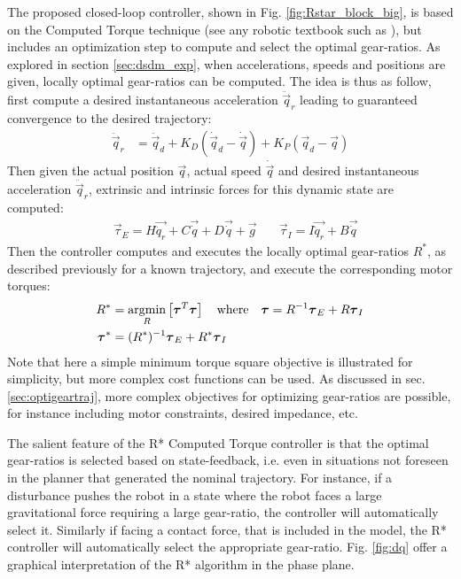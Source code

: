 The proposed closed-loop controller, shown in Fig. \ref{fig:Rstar_block_big}, is based on the Computed Torque technique (see any robotic textbook such as \cite{asada_robot_1986}), but includes an optimization step to compute and select the optimal gear-ratios. As explored in section \ref{sec:dsdm_exp}, when accelerations, speeds and positions are given, locally optimal gear-ratios can be computed. The idea is thus as follow, first compute a desired instantaneous acceleration $\ddot{\vec{q}}_r$ leading to guaranteed convergence to the desired trajectory:
%
\begin{align}
\ddot{\vec{q}}_r &= \ddot{\vec{q}}_d + K_D ( \dot{\vec{q}}_d - \dot{\vec{q}} ) + K_P ( \vec{q}_d - \vec{q} ) 
\end{align} 
%
Then given the actual position $\vec{q}$, actual speed $\dot{\vec{q}}$ and desired instantaneous acceleration $\ddot{\vec{q}}_r$, extrinsic and intrinsic forces for this dynamic state are computed:
%
\begin{align}
	&\vec{\tau}_{E} = H \vec{ \ddot{q}_r } + C\vec{ \dot{q} } + D \vec{ \dot{q} } + \vec{ g } \quad
	&\vec{\tau}_{I} = I \vec{ \ddot{q}_r } + B \vec{ \dot{q} } 
\end{align}
%
Then the controller computes and executes the locally optimal gear-ratios $R^*$, as described previously for a known trajectory, and execute the corresponding motor torques: 
%
\begin{align}
R^{*} &= \operatornamewithlimits{argmin}\limits_{R} \left[ \vec{\tau}^T\vec{\tau}  \right] \quad\text{where}\quad \vec{\tau} = R^{-1} \vec{\tau}_{E} + R \vec{\tau}_{I}
\\
\vec{\tau}^* &= (R^*)^{-1} \vec{\tau}_{E} + R^* \vec{\tau}_{I}
\end{align} 
%
Note that here a simple minimum torque square objective is illustrated for simplicity, but more complex cost functions can be used. As discussed in sec. \ref{sec:optigeartraj}, more complex objectives for optimizing gear-ratios are possible, for instance including motor constraints, desired impedance, etc. 


The salient feature of the R* Computed Torque controller is that the optimal gear-ratios is selected based on state-feedback, i.e. even in situations not foreseen in the planner that generated the nominal trajectory. For instance, if a disturbance pushes the robot in a state where the robot faces a large gravitational force requiring a large gear-ratio, the controller will automatically select it. Similarly if facing a contact force, that is included in the model, the R* controller will automatically select the appropriate gear-ratio. Fig. \ref{fig:dq} offer a graphical interpretation of the R* algorithm in the phase plane. 

